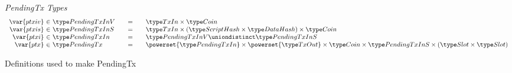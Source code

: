 \begin{figure*}[htb]
  \emph{PendingTx Types}
  \begin{equation*}
    \begin{array}{r@{~\in~}l@{\qquad=\qquad}l}
      \var{ptxiv}
      & \PendingTxInV
      & \TxIn \times \Coin
      \\
      \var{ptxis}
      & \PendingTxInS
      & \TxIn \times (\HashScr \times \HashDat) \times \Coin
      \\
      \var{ptxi}
      & \PendingTxIn
      & \PendingTxInV \uniondistinct \PendingTxInS
      \\
      \var{ptx}
      & \PendingTx
      & \powerset{\PendingTxIn} \times  \powerset{\TxOut} \times \Coin \times
      \PendingTxInS \times (\Slot\times\Slot)
      \\
    \end{array}
  \end{equation*}
  \caption{Definitions used to make PendingTx}
  \label{fig:defs:utxo-pending}
\end{figure*}

